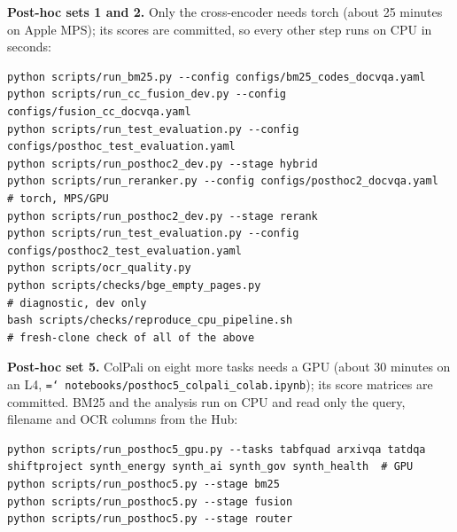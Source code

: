 \documentclass[11pt,a4paper]{article}
\newcommand{\file}[1]{\texttt{\small\hyphenchar\font=`\/ #1}}
\begin{document}
\noindent\textbf{Post-hoc sets 1 and 2.} Only the cross-encoder needs torch (about 25 minutes on Apple MPS); its scores are committed, so every other step runs on CPU in seconds:
\begin{Verbatim}[fontsize=\footnotesize,breaklines=true]
python scripts/run_bm25.py --config configs/bm25_codes_docvqa.yaml
python scripts/run_cc_fusion_dev.py --config configs/fusion_cc_docvqa.yaml
python scripts/run_test_evaluation.py --config configs/posthoc_test_evaluation.yaml
python scripts/run_posthoc2_dev.py --stage hybrid
python scripts/run_reranker.py --config configs/posthoc2_docvqa.yaml   # torch, MPS/GPU
python scripts/run_posthoc2_dev.py --stage rerank
python scripts/run_test_evaluation.py --config configs/posthoc2_test_evaluation.yaml
python scripts/ocr_quality.py
python scripts/checks/bge_empty_pages.py                               # diagnostic, dev only
bash scripts/checks/reproduce_cpu_pipeline.sh                          # fresh-clone check of all of the above
\end{Verbatim}

\noindent\textbf{Post-hoc set 5.} ColPali on eight more tasks needs a GPU (about 30 minutes on an L4, \file{notebooks/posthoc5\_colpali\_colab.ipynb}); its score matrices are committed. BM25 and the analysis run on CPU and read only the query, filename and OCR columns from the Hub:
\begin{Verbatim}[fontsize=\footnotesize,breaklines=true]
python scripts/run_posthoc5_gpu.py --tasks tabfquad arxivqa tatdqa shiftproject synth_energy synth_ai synth_gov synth_health  # GPU
python scripts/run_posthoc5.py --stage bm25
python scripts/run_posthoc5.py --stage fusion
python scripts/run_posthoc5.py --stage router
\end{Verbatim}
\end{document}
